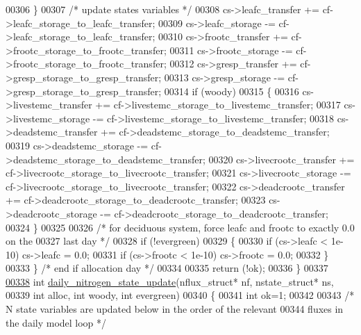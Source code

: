 \begin{DoxyCode}
{00306         \}
00307         \textcolor{comment}{/* update states variables */}
00308         cs->leafc\_transfer    += cf->leafc\_storage\_to\_leafc\_transfer;
00309         cs->leafc\_storage     -= cf->leafc\_storage\_to\_leafc\_transfer;
00310         cs->frootc\_transfer   += cf->frootc\_storage\_to\_frootc\_transfer;
00311         cs->frootc\_storage    -= cf->frootc\_storage\_to\_frootc\_transfer;
00312         cs->gresp\_transfer    += cf->gresp\_storage\_to\_gresp\_transfer;
00313         cs->gresp\_storage     -= cf->gresp\_storage\_to\_gresp\_transfer;
00314         \textcolor{keywordflow}{if} (woody)
00315         \{
00316             cs->livestemc\_transfer  += cf->livestemc\_storage\_to\_livestemc\_transfer;
00317             cs->livestemc\_storage   -= cf->livestemc\_storage\_to\_livestemc\_transfer;
00318             cs->deadstemc\_transfer  += cf->deadstemc\_storage\_to\_deadstemc\_transfer;
00319             cs->deadstemc\_storage   -= cf->deadstemc\_storage\_to\_deadstemc\_transfer;
00320             cs->livecrootc\_transfer += cf->livecrootc\_storage\_to\_livecrootc\_transfer;
00321             cs->livecrootc\_storage  -= cf->livecrootc\_storage\_to\_livecrootc\_transfer;
00322             cs->deadcrootc\_transfer += cf->deadcrootc\_storage\_to\_deadcrootc\_transfer;
00323             cs->deadcrootc\_storage  -= cf->deadcrootc\_storage\_to\_deadcrootc\_transfer;
00324         \}
00325         
00326         \textcolor{comment}{/* for deciduous system, force leafc and frootc to exactly 0.0 on the}
00327 \textcolor{comment}{        last day */}
00328         \textcolor{keywordflow}{if} (!evergreen)
00329         \{
00330             \textcolor{keywordflow}{if} (cs->leafc < 1e-10) cs->leafc = 0.0;
00331             \textcolor{keywordflow}{if} (cs->frootc < 1e-10) cs->frootc = 0.0;
00332         \}
00333     \} \textcolor{comment}{/* end if allocation day */}
00334     
00335     \textcolor{keywordflow}{return} (!ok);
00336 \}       
00337 
\hypertarget{state__update_8c_source_l00338}{}\hyperlink{state__update_8c_aac44819d8b0419079683705a5a220e7a}{00338} \textcolor{keywordtype}{int} \hyperlink{state__update_8c_aac44819d8b0419079683705a5a220e7a}{daily\_nitrogen\_state\_update}(nflux\_struct* nf, nstate\_struct* ns,
00339 \textcolor{keywordtype}{int} alloc, \textcolor{keywordtype}{int} woody, \textcolor{keywordtype}{int} evergreen)
00340 \{
00341     \textcolor{keywordtype}{int} ok=1;
00342     
00343     \textcolor{comment}{/* N state variables are updated below in the order of the relevant}
00344 \textcolor{comment}{    fluxes in the daily model loop */}
}
\end{DoxyCode}
